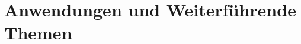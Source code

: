 %
%
\part{Anwendungen und Weiterführende Themen}

\def\chapterauthor#1{{\large #1}\bigskip\bigskip}



